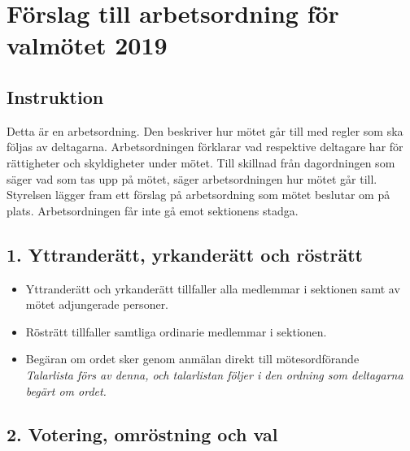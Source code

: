 \documentclass[12pt]{article}
\begin{document}
 
 
 \section*{Förslag till arbetsordning för valmötet 2019}
    
    
    \subsection*{Instruktion}

    Detta är en arbetsordning. Den beskriver hur mötet går till med regler som ska följas av deltagarna. Arbetsordningen förklarar vad respektive deltagare har för rättigheter och skyldigheter under mötet. Till skillnad från dagordningen som säger vad som tas upp på mötet, säger arbetsordningen hur mötet går till. Styrelsen lägger fram ett förslag på arbetsordning som mötet beslutar om på plats. Arbetsordningen får inte gå emot sektionens stadga.

    \subsection*{1. Yttranderätt, yrkanderätt och rösträtt}

    \begin{itemize}
    \item Yttranderätt och yrkanderätt tillfaller alla medlemmar i sektionen samt av mötet adjungerade personer.
    \item Rösträtt tillfaller samtliga ordinarie medlemmar i sektionen.
    \item Begäran om ordet sker genom anmälan direkt till mötesordförande
    \\ \textit{Talarlista förs av denna, och talarlistan följer i den ordning som deltagarna begärt om ordet.}
    \end{itemize}


    \subsection*{2. Votering, omröstning och val}
    
\end{document}
